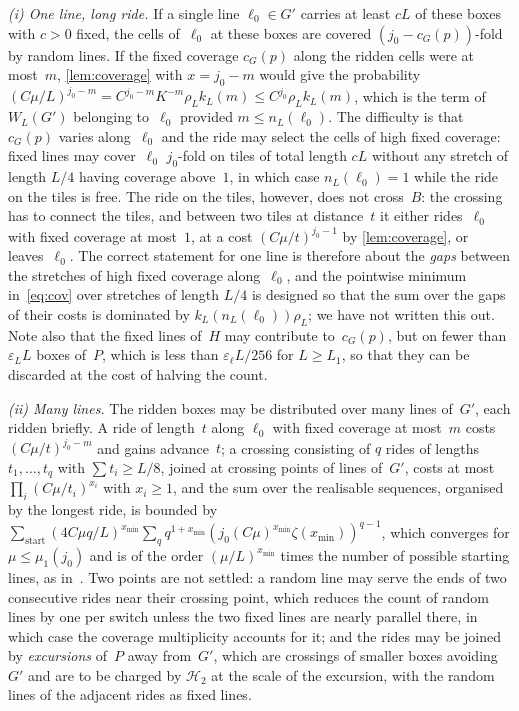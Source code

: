 \documentclass[11pt,letterpaper]{article}
\begin{document}
\emph{(i) One line, long ride.} If a single line $\ell_0\in G'$ carries at least $cL$ of these boxes with $c>0$ fixed, the cells of~$\ell_0$ at these boxes are covered $(j_0-c_G(p))$-fold by random lines. If the fixed coverage $c_G(p)$ along the ridden cells were at most~$m$, \cref{lem:coverage} with $x=j_0-m$ would give the probability $(C\mu/L)^{j_0-m}=C^{j_0-m}K^{-m}\rho_Lk_L(m)\le C^{j_0}\rho_Lk_L(m)$, which is the term of $W_L(G')$ belonging to~$\ell_0$ provided $m\le n_L(\ell_0)$. The difficulty is that $c_G(p)$ varies along~$\ell_0$ and the ride may select the cells of high fixed coverage: fixed lines may cover~$\ell_0$ $j_0$-fold on tiles of total length $cL$ without any stretch of length $L/4$ having coverage above~$1$, in which case $n_L(\ell_0)=1$ while the ride on the tiles is free. The ride on the tiles, however, does not cross~$B$: the crossing has to connect the tiles, and between two tiles at distance~$t$ it either rides~$\ell_0$ with fixed coverage at most~$1$, at a cost $(C\mu/t)^{j_0-1}$ by \cref{lem:coverage}, or leaves~$\ell_0$. The correct statement for one line is therefore about the \emph{gaps} between the stretches of high fixed coverage along~$\ell_0$, and the pointwise minimum in~\eqref{eq:cov} over stretches of length $L/4$ is designed so that the sum over the gaps of their costs is dominated by $k_L(n_L(\ell_0))\rho_L$; we have not written this out. Note also that the fixed lines of~$H$ may contribute to~$c_G(p)$, but on fewer than $\varepsilon_LL$ boxes of~$P$, which is less than $\varepsilon_\ell L/256$ for $L\ge L_1$, so that they can be discarded at the cost of halving the count.

\emph{(ii) Many lines.} The ridden boxes may be distributed over many lines of~$G'$, each ridden briefly. A ride of length~$t$ along $\ell_0$ with fixed coverage at most~$m$ costs $(C\mu/t)^{j_0-m}$ and gains advance~$t$; a crossing consisting of $q$ rides of lengths $t_1,\dots,t_q$ with $\sum t_i\ge L/8$, joined at crossing points of lines of~$G'$, costs at most $\prod_i(C\mu/t_i)^{x_i}$ with $x_i\ge1$, and the sum over the realisable sequences, organised by the longest ride, is bounded by $\sum_{\text{start}}(4C\mu q/L)^{x_{\min}}\sum_qq^{1+x_{\min}}(j_0(C\mu)^{x_{\min}}\zeta(x_{\min}))^{q-1}$, which converges for $\mu\le\mu_1(j_0)$ and is of the order $(\mu/L)^{x_{\min}}$ times the number of possible starting lines, as in~\cite[Section~7]{MS26}. Two points are not settled: a random line may serve the ends of two consecutive rides near their crossing point, which reduces the count of random lines by one per switch unless the two fixed lines are nearly parallel there, in which case the coverage multiplicity accounts for it; and the rides may be joined by \emph{excursions} of~$P$ away from~$G'$, which are crossings of smaller boxes avoiding~$G'$ and are to be charged by $\mathcal H_2$ at the scale of the excursion, with the random lines of the adjacent rides as fixed lines.
\end{document}
